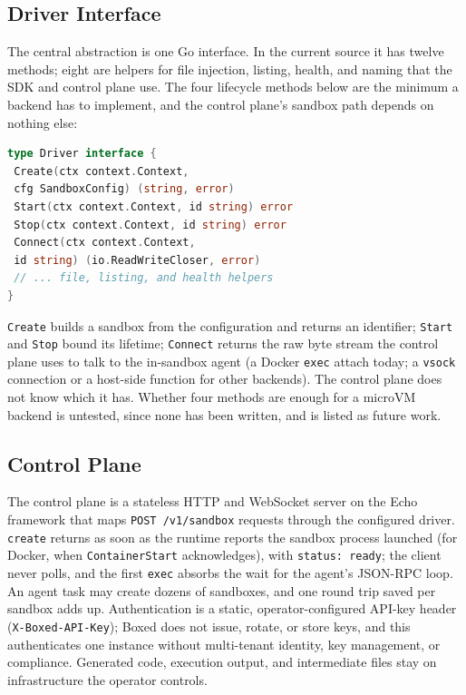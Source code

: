 \documentclass[conference]{IEEEtran}
\begin{document}
\subsection{Driver Interface}\label{sec:driver}
The central abstraction is one Go interface. In the current source it has
twelve methods; eight are helpers for file injection, listing, health, and
naming that the SDK and control plane use. The four lifecycle methods below
are the minimum a backend has to implement, and the control plane's sandbox
path depends on nothing else:

\begin{lstlisting}[language=Go]
type Driver interface {
 Create(ctx context.Context,
 cfg SandboxConfig) (string, error)
 Start(ctx context.Context, id string) error
 Stop(ctx context.Context, id string) error
 Connect(ctx context.Context,
 id string) (io.ReadWriteCloser, error)
 // ... file, listing, and health helpers
}
\end{lstlisting}

\texttt{Create} builds a sandbox from the configuration and returns an
identifier; \texttt{Start} and \texttt{Stop} bound its lifetime;
\texttt{Connect} returns the raw byte stream the control plane uses to
talk to the in-sandbox agent (a Docker \texttt{exec} attach today; a
\texttt{vsock} connection or a host-side function for other backends).
The control plane does not know which it has. Whether four methods are
enough for a microVM backend is untested, since none has been written, and
is listed as future work.

\subsection{Control Plane}
The control plane is a stateless HTTP and WebSocket server on the Echo
framework that maps \texttt{POST /v1/sandbox} requests through the
configured driver. \texttt{create} returns as soon as the runtime reports
the sandbox process launched (for Docker, when \texttt{ContainerStart}
acknowledges), with \texttt{status: ready}; the client never polls, and the
first \texttt{exec} absorbs the wait for the agent's JSON-RPC loop. An
agent task may create dozens of sandboxes, and one round trip saved per
sandbox adds up. Authentication is a static, operator-configured API-key
header (\texttt{X-Boxed-API-Key}); Boxed does not issue, rotate, or store
keys, and this authenticates one instance without multi-tenant identity, key
management, or compliance. Generated code, execution output, and
intermediate files stay on infrastructure the operator controls.
\end{document}
